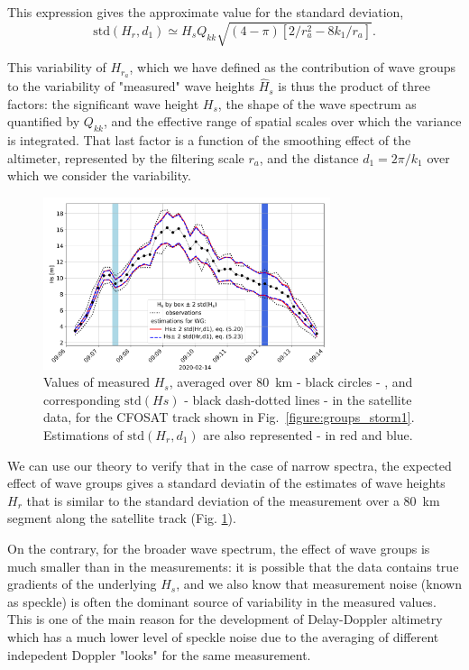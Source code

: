 {This expression gives the approximate value for the standard deviation,
\begin{equation}
    \mathrm{std}(H_{r},d_1) \simeq  H_s   Q_{kk}  \sqrt{ (4-\pi) \left[2/r_a^2 -  8 k_1 / r_a\right] }.\label{eq:Lambda2}
\end{equation}

{This variability of $H_{r_a}$, which we have defined as the contribution of wave groups to the variability of "measured" wave heights $\widehat{H}_s$ is thus the product of three factors: the significant wave height $H_s$, the shape of the wave spectrum as quantified by $Q_{kk}$, and the effective range of spatial scales over which the variance is integrated. That last factor is a function of the smoothing effect of the altimeter, represented by the filtering scale $r_a$, and the distance $d_1=2\pi / k_1$ over which  we consider the variability.


\begin{figure}[ht!]
\centerline{\includegraphics[width=0.75\textwidth]{FIGS_CH_GROUPS/groups_Storm_Dennis_2023_fig3.pdf}}
    \caption{Values of measured $H_s$, averaged over 80~km - black circles - ,  and corresponding $\mathrm{std}(Hs)$ - black dash-dotted lines - in the satellite data, for the CFOSAT track shown in Fig.~\ref{figure:groups_storm1}. Estimations of $\mathrm{std}(H_r,d_1)$ are also represented - in red and blue.} 
   \label{figure:groups_storm3}
\end{figure}
We can use our theory to verify that in the case of narrow spectra, the expected effect of wave groups gives a standard deviatin of the estimates of wave heights $H_r$ that is similar to the standard deviation of the measurement over a 80~km segment along the satellite track (Fig. \ref{figure:groups_storm3}). 

On the contrary, for the broader wave spectrum, the effect of wave groups is much smaller than in the measurements: it is possible that the data contains true gradients of the underlying $H_s$, and we also know that measurement noise (known as speckle) is often the dominant source of variability in the measured values. This is one of the main reason for the development of Delay-Doppler altimetry which has a much lower level of speckle noise due to the averaging of different indepedent Doppler "looks" for the same measurement. 

}}
